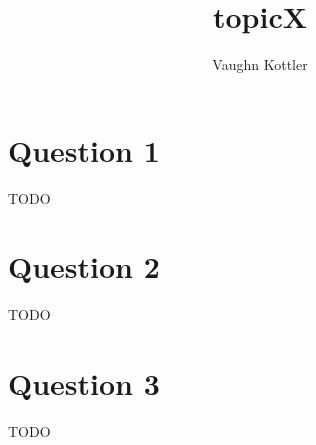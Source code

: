 \documentclass[letterpaper,10pt]{article}
\title{topicX}
\author{Vaughn Kottler}
\begin{document}
\section*{\break
	Question 1
}

TODO

\section*{Question 2}

TODO

\section*{Question 3}

TODO
\end{document}
